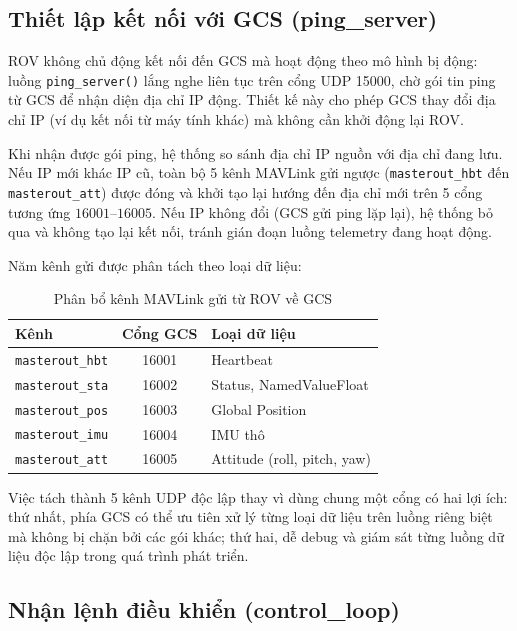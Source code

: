 \documentclass[../DoAn.tex]{subfiles}
\begin{document}
\subsection{Thiết lập kết nối với GCS (ping\_server)}

ROV không chủ động kết nối đến GCS mà hoạt động theo mô hình bị động:
luồng \texttt{ping\_server()} lắng nghe liên tục trên cổng UDP 15000,
chờ gói tin ping từ GCS để nhận diện địa chỉ IP động. Thiết kế này
cho phép GCS thay đổi địa chỉ IP (ví dụ kết nối từ máy tính khác)
mà không cần khởi động lại ROV.

Khi nhận được gói ping, hệ thống so sánh địa chỉ IP nguồn với địa chỉ
đang lưu. Nếu IP mới khác IP cũ, toàn bộ 5 kênh MAVLink gửi ngược
(\texttt{masterout\_hbt} đến \texttt{masterout\_att}) được đóng và khởi
tạo lại hướng đến địa chỉ mới trên 5 cổng tương ứng
$16001$--$16005$. Nếu IP không đổi (GCS gửi ping lặp lại), hệ thống
bỏ qua và không tạo lại kết nối, tránh gián đoạn luồng telemetry
đang hoạt động.

Năm kênh gửi được phân tách theo loại dữ liệu:

\begin{table}[H]
\centering
\renewcommand{\arraystretch}{1.3}
\begin{tabular}{|l|c|l|}
\hline
\textbf{Kênh} & \textbf{Cổng GCS} & \textbf{Loại dữ liệu} \\
\hline
\texttt{masterout\_hbt} & 16001 & Heartbeat \\
\texttt{masterout\_sta} & 16002 & Status, NamedValueFloat \\
\texttt{masterout\_pos} & 16003 & Global Position \\
\texttt{masterout\_imu} & 16004 & IMU thô \\
\texttt{masterout\_att} & 16005 & Attitude (roll, pitch, yaw) \\
\hline
\end{tabular}
\caption{Phân bổ kênh MAVLink gửi từ ROV về GCS}
\label{tab:mavlink_channels}
\end{table}

Việc tách thành 5 kênh UDP độc lập thay vì dùng chung một cổng có hai
lợi ích: thứ nhất, phía GCS có thể ưu tiên xử lý từng loại dữ liệu
trên luồng riêng biệt mà không bị chặn bởi các gói khác; thứ hai,
dễ debug và giám sát từng luồng dữ liệu độc lập trong quá trình phát
triển.

\subsection{Nhận lệnh điều khiển (control\_loop)}
\end{document}
